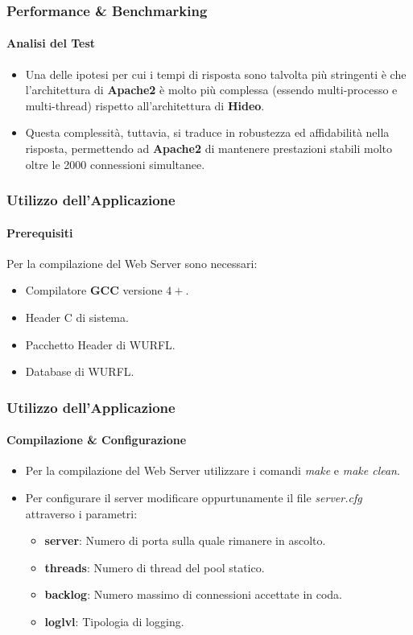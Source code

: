 \documentclass{beamer}
\begin{document}
\begin{frame}
\frametitle{Performance \& Benchmarking}
\framesubtitle{Analisi del Test}

\begin{itemize}
\item Una delle ipotesi per cui i tempi di risposta sono talvolta più stringenti è che
l’architettura di \textbf{Apache2} è molto più complessa (essendo multi-processo e multi-thread) rispetto all’architettura di \textbf{Hideo}.
\item Questa complessità, tuttavia, si traduce in robustezza ed affidabilità nella risposta,
permettendo ad \textbf{Apache2} di mantenere prestazioni stabili molto oltre le 2000
connessioni simultanee.
\end{itemize}
\end{frame}




\begin{frame}
\frametitle{Utilizzo dell'Applicazione}
\framesubtitle{Prerequisiti}
Per la compilazione del Web Server sono necessari:
\begin{itemize}
\item Compilatore \textbf{GCC} versione $4+$.
\item Header C di sistema.
\item Pacchetto Header di WURFL.
\item Database di WURFL.
\end{itemize}








\end{frame}



\begin{frame}
\frametitle{Utilizzo dell'Applicazione}
\framesubtitle{Compilazione \& Configurazione}

\begin{itemize}
\item Per la compilazione del Web Server utilizzare i comandi \textit{make} e \textit{make clean}.

\item Per configurare il server modificare oppurtunamente il file \textit{server.cfg} attraverso i parametri:
\begin{itemize}
\medskip
\item \textbf{server}: Numero di porta sulla quale rimanere in ascolto.
\medskip
\item \textbf{threads}: Numero di thread del pool statico.
\medskip
\item \textbf{backlog}: Numero massimo di connessioni accettate in coda.
\medskip
\item \textbf{loglvl}: Tipologia di logging.
\end{itemize}
\end{itemize}

\end{frame}
\end{document}
